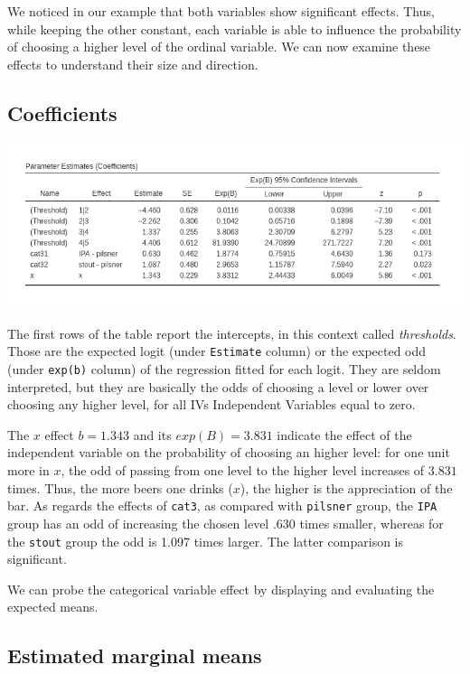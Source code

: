 \documentclass[
]{book}
\begin{document}
We noticed in our example that both variables show significant effects. Thus, while keeping the other constant, each variable is able to influence the probability of choosing a higher level of the ordinal variable. We can now examine these effects to understand their size and direction.

\hypertarget{coefficients-3}{%
\subsection{Coefficients}\label{coefficients-3}}

\includegraphics[width=10.44in]{bookletpics/3_ordinal_output4}

The first rows of the table report the intercepts, in this context called \emph{thresholds}. Those are the expected logit (under \texttt{Estimate} column) or the expected odd (under \texttt{exp(b)} column) of the regression fitted for each logit. They are seldom interpreted, but they are basically the odds of choosing a level or lower over choosing any higher level, for all {IVs {Independent Variables} } equal to zero.

The \(x\) effect \(b=1.343\) and its \(exp(B)=3.831\) indicate the effect of the independent variable on the probability of choosing an higher level: for one unit more in \(x\), the odd of passing from one level to the higher level increases of \(3.831\) times. Thus, the more beers one drinks (\(x\)), the higher is the appreciation of the bar. As regards the effects of \texttt{cat3}, as compared with \texttt{pilsner} group, the \texttt{IPA} group has an odd of increasing the chosen level .630 times smaller, whereas for the \texttt{stout} group the odd is 1.097 times larger. The latter comparison is significant.

We can probe the categorical variable effect by displaying and evaluating the expected means.

\hypertarget{estimated-marginal-means-2}{%
\subsection{Estimated marginal means}\label{estimated-marginal-means-2}}
\end{document}
